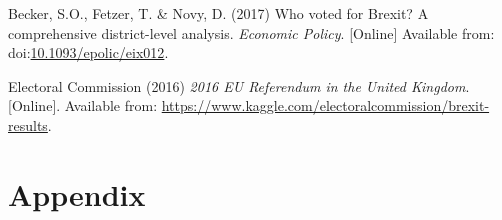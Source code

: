 \documentclass[]{article}
\begin{document}
\leavevmode\hypertarget{ref-Becker2017}{}%
Becker, S.O., Fetzer, T. \& Novy, D. (2017) Who voted for Brexit? A
comprehensive district-level analysis. \emph{Economic Policy}.
{[}Online{]} Available from:
doi:\href{https://doi.org/10.1093/epolic/eix012}{10.1093/epolic/eix012}.

\leavevmode\hypertarget{ref-ElectoralCommission2016}{}%
Electoral Commission (2016) \emph{2016 EU Referendum in the United
Kingdom}. {[}Online{]}. Available from:
\url{https://www.kaggle.com/electoralcommission/brexit-results}.

\hypertarget{appendix}{%
\section{Appendix}\label{appendix}}
\end{document}
